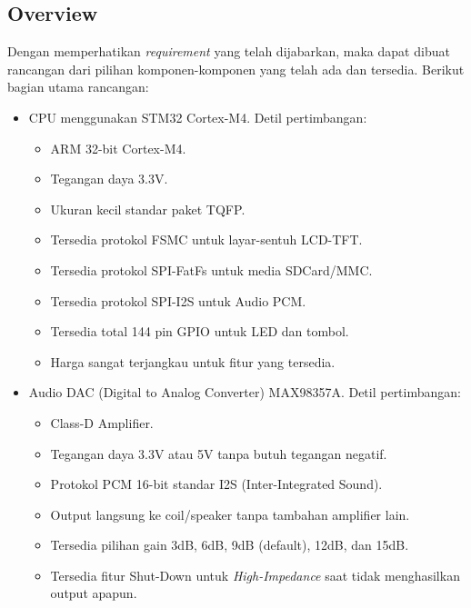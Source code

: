 \documentclass[12pt,]{article}
\begin{document}
	\subsection{Overview}
	Dengan memperhatikan \textit{requirement} yang telah dijabarkan, maka dapat dibuat rancangan dari pilihan
	komponen-komponen yang telah ada dan tersedia.
	Berikut bagian utama rancangan:
	\begin{itemize}
		\item CPU menggunakan STM32 Cortex-M4.
		Detil pertimbangan:
		\begin{itemize}
			\item ARM 32-bit Cortex-M4.
			\item Tegangan daya 3.3V.
			\item Ukuran kecil standar paket TQFP.
			\item Tersedia protokol FSMC untuk layar-sentuh LCD-TFT.
			\item Tersedia protokol SPI-FatFs untuk media SDCard/MMC.
			\item Tersedia protokol SPI-I2S untuk Audio PCM.
			\item Tersedia total 144 pin GPIO untuk LED dan tombol.
			\item Harga sangat terjangkau untuk fitur yang tersedia.
		\end{itemize}

		\item Audio DAC (Digital to Analog Converter) MAX98357A.
		Detil pertimbangan:
		\begin{itemize}
			\item Class-D Amplifier.
			\item Tegangan daya 3.3V atau 5V tanpa butuh tegangan negatif.
			\item Protokol PCM 16-bit standar I2S (Inter-Integrated Sound).
			\item Output langsung ke coil/speaker tanpa tambahan amplifier lain.
			\item Tersedia pilihan gain 3dB, 6dB, 9dB (default), 12dB, dan 15dB.
			\item Tersedia fitur Shut-Down untuk \textit{High-Impedance}
			saat tidak menghasilkan output apapun.
		\end{itemize}
	\end{itemize}
\end{document}
